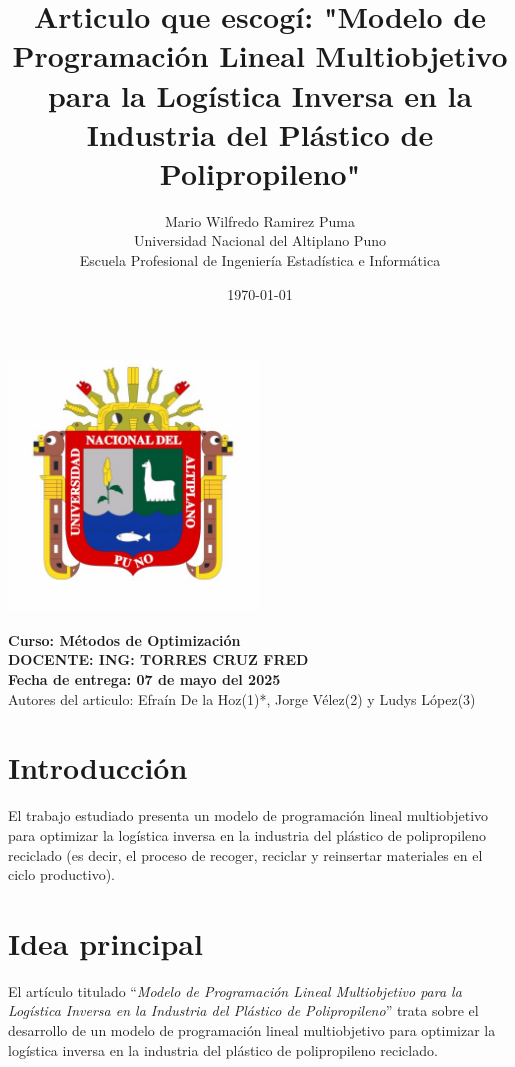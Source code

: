\documentclass[a4paper,12pt]{article}
\title{\textbf{Articulo que escogí: "Modelo de Programación Lineal Multiobjetivo para la Logística Inversa en la Industria del Plástico de Polipropileno"}}
\author{
    Mario Wilfredo Ramirez Puma \\
    Universidad Nacional del Altiplano Puno \\
    Escuela Profesional de Ingeniería Estadística e Informática
}
\date{\today}
\begin{document}
\maketitle
\begin{center}
    \includegraphics[width=0.5\textwidth]{UNAPuno_logo.jpg}
    \vspace{1cm}
    
    \textbf{Curso: Métodos de Optimización} \\
    \textbf{DOCENTE: ING: TORRES CRUZ FRED  } \\
    \vspace{1cm}
    \textbf{Fecha de entrega: 07 de mayo del 2025}\\
    Autores del articulo: Efraín De la Hoz(1)*, Jorge Vélez(2) y Ludys López(3)
\end{center}

\newpage

\section*{Introducción}
El trabajo estudiado presenta un modelo de programación lineal multiobjetivo para optimizar la logística inversa en la industria del plástico de polipropileno reciclado (es decir, el proceso de recoger, reciclar y reinsertar materiales en el ciclo productivo).

\newpage

\section*{Idea principal}
El artículo titulado ``\textit{Modelo de Programación Lineal Multiobjetivo para la Logística Inversa en la Industria del Plástico de Polipropileno}'' trata sobre el desarrollo de un modelo de programación lineal multiobjetivo para optimizar la logística inversa en la industria del plástico de polipropileno reciclado.
\end{document}
